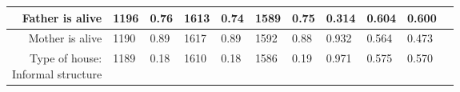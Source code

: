 \begin{longtable}{|r|l|l|l|l|l|l|l|l|l|l}
\hline

	 Father is alive                                                    & 1196                                                               &  0.76                                                              & 1613                                                               &  0.74                                                              & 1589                                                               &  0.75                                                              & 0.314                                                              & 0.604                                                              & 0.600                                                             \\

\hline

	 Mother is alive                                                    & 1190                                                               &  0.89                                                              & 1617                                                               &  0.89                                                              & 1592                                                               &  0.88                                                              & 0.932                                                              & 0.564                                                              & 0.473                                                             \\

\hline

	\makecell{ Type of house: \\ Informal structure}                                  & 1189                                                               &  0.18                                                              & 1610                                                               &  0.18                                                              & 1586                                                               &  0.19                                                              & 0.971                                                              & 0.575                                                              & 0.570                                                             \\

\hline


\end{longtable}
